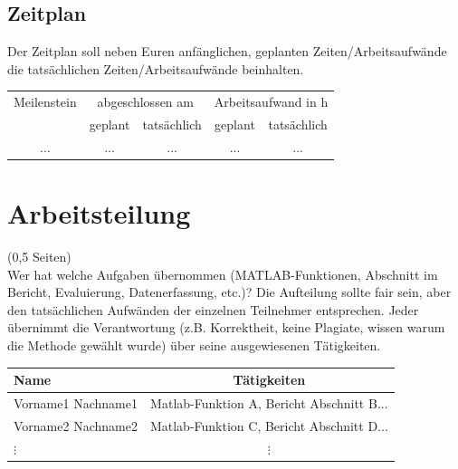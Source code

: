 \documentclass[paper=A4, deutsch]{scrartcl}
\begin{document}
\subsection{Zeitplan}
Der Zeitplan soll neben Euren anfänglichen, geplanten Zeiten/Arbeitsaufwände die tatsächlichen Zeiten/Arbeitsaufwände beinhalten. 
\begin{table}[h!]
	\centering
	\begin{tabular}{|c|c|c|c|c|}
		\hline
		Meilenstein & \multicolumn{2}{c|}{abgeschlossen am} & \multicolumn{2}{c|}{Arbeitsaufwand in h}\\
		\cline{2-5}
		 & geplant & tatsächlich & geplant & tatsächlich\\
		\hline
		...&... &... &... &...\\
		\hline
	\end{tabular}
\end{table}

\section{Arbeitsteilung}
(0,5 Seiten)\\
Wer hat welche Aufgaben übernommen (MATLAB-Funktionen, Abschnitt im Bericht, Evaluierung, Datenerfassung, etc.)? Die Aufteilung sollte fair sein, aber den tatsächlichen Aufwänden der einzelnen Teilnehmer entsprechen. Jeder übernimmt die Verantwortung (z.B. Korrektheit, keine Plagiate, wissen warum die Methode gewählt wurde) über seine ausgewiesenen Tätigkeiten.

\begin{center}
  \begin{tabular}{ |l | c | }
    \hline
  Name & Tätigkeiten\\
    \hline
		Vorname1 Nachname1 & Matlab-Funktion A, Bericht Abschnitt B...\\
		\hline
		Vorname2 Nachname2 & Matlab-Funktion C, Bericht Abschnitt D...\\
		\hline
		$\vdots$ & $\vdots$\\
  \end{tabular}
\end{center}


\end{document}
